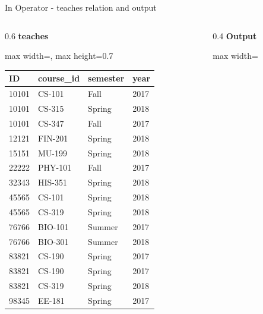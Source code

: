 \documentclass[aspectratio=169, xcolor=dvipsnames]{beamer}
\begin{document}
\begin{frame}{In Operator - teaches relation and output}
    \begin{columns}
        \begin{column}{0.6\textwidth}
            \textbf{teaches}
            \begin{center}
                \begin{adjustbox}{max width=\textwidth, max height=0.7\textheight}
                \begin{tabular}{|l|l|l|l|}
                \hline
                \textbf{ID} & \textbf{course\_id} & \textbf{semester} & \textbf{year} \\ \hline
                10101 & CS-101 & Fall & 2017 \\ \hline
                10101 & CS-315 & Spring & 2018 \\ \hline
                10101 & CS-347 & Fall & 2017 \\ \hline
                12121 & FIN-201 & Spring & 2018 \\ \hline
                15151 & MU-199 & Spring & 2018 \\ \hline
                22222 & PHY-101 & Fall & 2017 \\ \hline
                32343 & HIS-351 & Spring & 2018 \\ \hline
                45565 & CS-101 & Spring & 2018 \\ \hline
                45565 & CS-319 & Spring & 2018 \\ \hline
                76766 & BIO-101 & Summer & 2017 \\ \hline
                76766 & BIO-301 & Summer & 2018 \\ \hline
                83821 & CS-190 & Spring & 2017 \\ \hline
                83821 & CS-190 & Spring & 2017 \\ \hline
                83821 & CS-319 & Spring & 2018 \\ \hline
                98345 & EE-181 & Spring & 2017 \\ \hline
                \end{tabular}
                \end{adjustbox}
            \end{center}
        \end{column}
        \begin{column}{0.4\textwidth}
            \textbf{Output}
            \begin{center}
                \begin{adjustbox}{max width=\textwidth}

\end{adjustbox}
\end{center}
\end{column}
\end{columns}
\end{frame}
\end{document}
